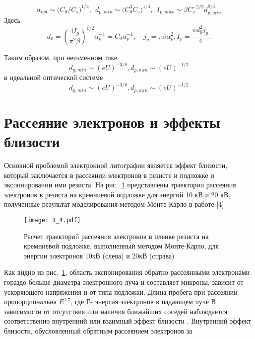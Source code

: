 \begin{equation}
\alpha_{opt}\sim{(}C_0/C_s{)}^{1/4},\>\>d_{p,min}\sim{(}C_0^3 C_s{)}^{1/4},\>\> I_{p,max}\sim \beta C_s^{-2/3} d_{p,min}^{8/3}\label{eq:A6}
\end{equation}
Здесь
\[
    d_0= \left(\frac{4I_p}{\pi^2 \beta}\right)^{1/2} \alpha_p^{-1}=C_0\alpha_p^{-1},
    \quad j_p=\pi \beta \alpha_p^2 , I_p= \frac{\pi d_0^2 j_p}{4}.
\]

Таким образом, при неизменном токе
\begin{equation}
d_{p,min}\sim (eU)^{-3/8},d_{p,min}\sim(eU)^{-1/2}
\label{eq:A7}
\end{equation}
в идеальной оптической системе
\begin{equation}
d_{p,min}\sim (eU)^{-3/8},d_{p,min}\sim(eU)^{-1/2}
\end{equation}

\section{Рассеяние электронов и эффекты близости}

Основной проблемой электронной литографии является эффект близости, который заключается в рассеянии электронов в резисте и подложке и экспонировании ими резиста. На рис.~\ref{fig:4} представлены траектории рассеяния электронов в резиста на кремниевой подложке для энергий 10 кВ и 20 кВ, полученные результат моделирования методом Монте-Карло в работе [4]

\begin{figure}[H]
\center
\texttt{[image: 1\_4.pdf]}
\caption{ Расчет траекторий рассеяния электронов в пленке резиста на кремниевой подложке, выполненный методом Монте-Карло, для энергии электронов 10кВ (слева) и 20кВ (справа)}
\label{fig:4}
\end{figure}

Как видно из рис.~\ref{fig:4}, область экспонирования обратно рассеянными электронами гораздо больше диаметра электронного луча и составляет микроны, зависит от ускоряющего напряжения и от типа подложки. Длина пробега при рассеянии пропорциональна $E^{1.7}$, где Е- энергия электронов в падающем луче
В зависимости от отсутствия или наличия ближайших соседей наблюдается соответственно внутренний или взаимный эффект близости . Внутренний эффект близости, обусловленный обратным рассеянием электронов за

